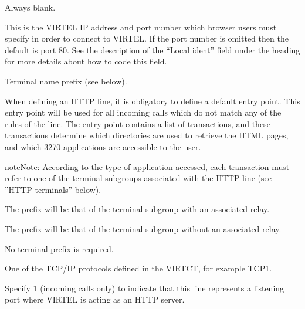 \documentclass[letterpaper,10pt,english]{sphinxmanual}
\begin{document}
\ignorespaces \begin{description}
\sphinxAtStartPar
Always blank.

\sphinxAtStartPar
This is the VIRTEL IP address and port number which browser users must specify in order to connect to VIRTEL. If the port number is omitted then the default is port 80. See the description of the
“Local ident” field under the heading  for more details about how to code this field.

\sphinxAtStartPar
Terminal name prefix (see below).

\sphinxAtStartPar
When defining an HTTP line, it is obligatory to define a default entry point. This entry point will be used for all incoming calls which do not match any of the rules of the line. The entry point contains a list of transactions, and these transactions determine which directories are used to retrieve the HTML pages, and which 3270 applications are accessible to the user.

\begin{sphinxadmonition}{note}{Note:}
\sphinxAtStartPar
According to the type of application accessed, each transaction must
refer to one of the terminal sub\sphinxhyphen{}groups associated with the HTTP
line (see ”HTTP terminals” below).
\end{sphinxadmonition}
\begin{description}
\sphinxAtStartPar
The prefix will be that of the terminal sub\sphinxhyphen{}group with an associated relay.

\sphinxAtStartPar
The prefix will be that of the terminal sub\sphinxhyphen{}group without an associated relay.

\sphinxAtStartPar
No terminal prefix is required.

\end{description}

\sphinxAtStartPar
One of the TCP/IP protocols defined in the VIRTCT, for example TCP1.

\sphinxAtStartPar
Specify 1 (incoming calls only) to indicate that this line
represents a listening port where VIRTEL is acting as an HTTP
server.


\end{description}
\end{document}
